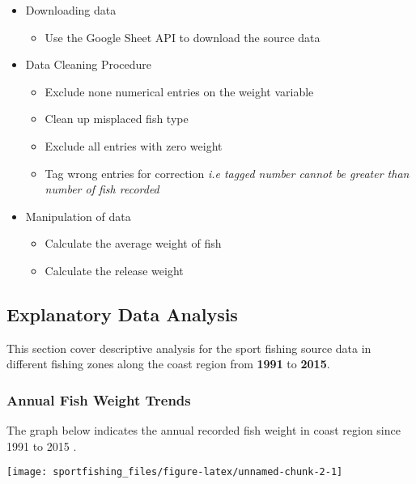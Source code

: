 \documentclass[
]{article}
\providecommand{\tightlist}{%
  \setlength{\itemsep}{0pt}\setlength{\parskip}{0pt}}
\begin{document}
\begin{itemize}
\tightlist
\item
  Downloading data

  \begin{itemize}
  \tightlist
  \item
    Use the Google Sheet API to download the source data
  \end{itemize}
\item
  Data Cleaning Procedure

  \begin{itemize}
  \tightlist
  \item
    Exclude none numerical entries on the weight variable
  \item
    Clean up misplaced fish type
  \item
    Exclude all entries with zero weight
  \item
    Tag wrong entries for correction \emph{i.e tagged number cannot be
    greater than number of fish recorded}
  \end{itemize}
\item
  Manipulation of data

  \begin{itemize}
  \tightlist
  \item
    Calculate the average weight of fish
  \item
    Calculate the release weight
  \end{itemize}
\end{itemize}

\newpage

\subsection{Explanatory Data Analysis}\label{explanatory-data-analysis}

This section cover descriptive analysis for the sport fishing source
data in different fishing zones along the coast region from
\textbf{1991} to \textbf{2015}.

\subsubsection{Annual Fish Weight
Trends}\label{annual-fish-weight-trends}

The graph below indicates the annual recorded fish weight in coast
region since 1991 to 2015 .

\begin{center}\texttt{[image: sportfishing\_files/figure-latex/unnamed-chunk-2-1]} \end{center}
\end{document}
